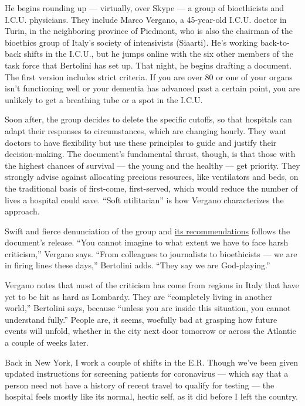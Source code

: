 He begins rounding up --- virtually, over Skype --- a group of
bioethicists and I.C.U. physicians. They include Marco Vergano, a
45-year-old I.C.U. doctor in Turin, in the neighboring province of
Piedmont, who is also the chairman of the bioethics group of Italy's
society of intensivists (Siaarti). He's working back-to-back shifts in
the I.C.U., but he jumps online with the six other members of the task
force that Bertolini has set up. That night, he begins drafting a
document. The first version includes strict criteria. If you are over 80
or one of your organs isn't functioning well or your dementia has
advanced past a certain point, you are unlikely to get a breathing tube
or a spot in the I.C.U.

Soon after, the group decides to delete the specific cutoffs, so that
hospitals can adapt their responses to circumstances, which are changing
hourly. They want doctors to have flexibility but use these principles
to guide and justify their decision-making. The document's fundamental
thrust, though, is that those with the highest chances of survival ---
the young and the healthy --- get priority. They strongly advise against
allocating precious resources, like ventilators and beds, on the
traditional basis of first-come, first-served, which would reduce the
number of lives a hospital could save. ``Soft utilitarian'' is how
Vergano characterizes the approach.

Swift and fierce denunciation of the group and
\href{https://www.cssr.news/2020/03/overwhelmed-by-the-virus-the-issue-of-extreme-triage/}{its
recommendations} follows the document's release. ``You cannot imagine to
what extent we have to face harsh criticism,'' Vergano says. ``From
colleagues to journalists to bioethicists --- we are in firing lines
these days,'' Bertolini adds. ``They say we are God-playing.''

Vergano notes that most of the criticism has come from regions in Italy
that have yet to be hit as hard as Lombardy. They are ``completely
living in another world,'' Bertolini says, because ``unless you are
inside this situation, you cannot understand fully.'' People are, it
seems, woefully bad at grasping how future events will unfold, whether
in the city next door tomorrow or across the Atlantic a couple of weeks
later.

Back in New York, I work a couple of shifts in the E.R. Though we've
been given updated instructions for screening patients for coronavirus
--- which say that a person need not have a history of recent travel to
qualify for testing --- the hospital feels mostly like its normal,
hectic self, as it did before I left the country.

